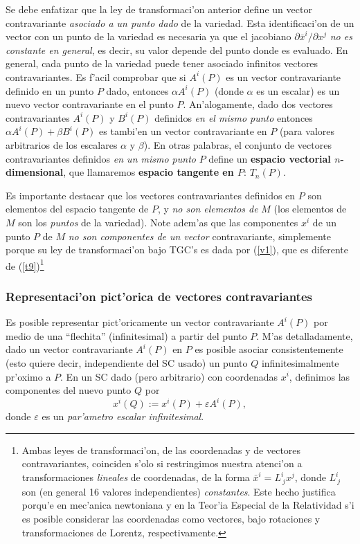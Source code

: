 Se debe enfatizar que la ley de transformaci'on anterior define un vector
contravariante \textit{asociado a un punto dado} de la variedad. Esta identificaci'on de un vector con un punto de la variedad es necesaria ya que el jacobiano  ${\partial\bar{x}^i}/{\partial x^j}$ \textit{no es constante en general}, es decir, su valor depende del punto donde es evaluado. En general, cada punto de la variedad puede tener asociado infinitos vectores contravariantes. Es
f'acil comprobar que si $A^i(P)$ es un vector contravariante definido en un
punto $P$ dado, entonces $\alpha A^i(P)$ (donde $\alpha$ es un escalar) es un
nuevo vector contravariante en el punto $P$. An'alogamente, dado dos vectores
contravariantes $A^i(P)$ y $B^i(P)$ definidos \textit{en el mismo punto}
entonces $\alpha A^i(P)+\beta B^i(P)$ es tambi'en un vector contravariante en
$P$ (para valores arbitrarios de los escalares $\alpha$ y $\beta$). En otras
palabras, el conjunto de vectores contravariantes definidos \textit{en un mismo punto} $P$ define un \textbf{espacio vectorial $n$-dimensional}, que llamaremos \textbf{espacio tangente en $P$}: $T_n(P)$. 

Es importante destacar que los vectores contravariantes definidos en $P$ son
elementos del espacio tangente de $P$, y \textit{no son elementos de} $M$ (los
elementos de $M$ son los \textit{puntos} de la variedad). Note adem'as que las componentes $x^i$ de un punto $P$ de $M$ \textit{no son componentes de un vector} contravariante, simplemente porque su ley de transformaci'on bajo TGC's es dada por (\ref{v1}), que es diferente de (\ref{t9})\footnote{Ambas leyes de transformaci'on, de las coordenadas y de vectores contravariantes, coinciden s'olo si restringimos nuestra atenci'on a transformaciones \textit{lineales} de coordenadas, de la forma $\bar{x}^i=L^i_{\ j}x^j$, donde $L^i_{\ j}$ son (en general 16 valores independientes) \textit{constantes}. Este hecho justifica porqu'e en mec'anica newtoniana y en la Teor'ia Especial de la Relatividad s'i es posible considerar las coordenadas como vectores, bajo rotaciones y transformaciones de Lorentz, respectivamente.}

\subsubsection{Representaci'on pict'orica de vectores contravariantes}
Es posible representar pict'oricamente un vector contravariante $A^i(P)$ por
medio de una ``flechita'' (infinitesimal) a partir del punto $P$. M'as detalladamente, dado un
vector contravariante $A^i(P)$ en $P$ es posible asociar consistentemente (esto quiere decir, independiente del SC usado) un punto $Q$ infinitesimalmente pr'oximo a $P$. En un SC dado (pero arbitrario) con coordenadas $x^i$, definimos las componentes del nuevo punto $Q$ por
\begin{equation}
x^i(Q):=x^i(P)+\varepsilon A^i(P), \label{defQ}
\end{equation}
donde $\varepsilon$ es un \textit{par'ametro escalar infinitesimal}.

